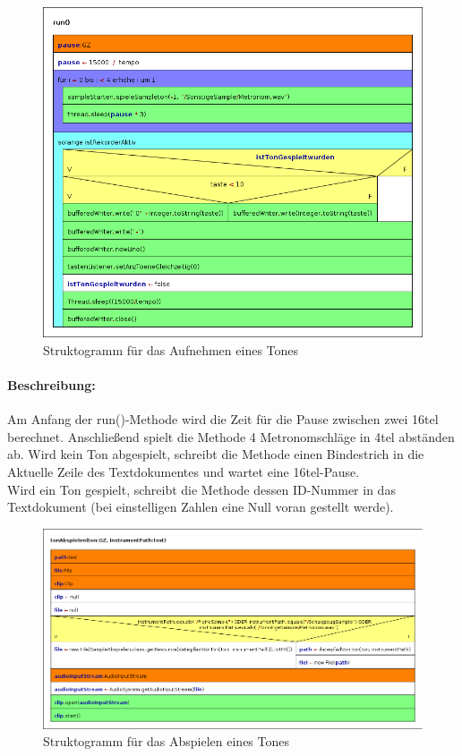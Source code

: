 \begin{figure}[h]
 \centering
 \includegraphics[width=1\textwidth]{./Bilder/Ton_Aufnehmen.png}
 \caption{Struktogramm für das Aufnehmen eines Tones}
\end{figure}

\paragraph{Beschreibung:} Am Anfang der run()-Methode wird die Zeit für die Pause zwischen zwei 
16tel berechnet. Anschließend spielt die Methode 4 Metronomschläge in 4tel abständen ab. Wird kein 
Ton abgespielt, schreibt die Methode einen Bindestrich in die Aktuelle Zeile des Textdokumentes und 
wartet eine 16tel-Pause.\\
Wird ein Ton gespielt, schreibt die Methode dessen ID-Nummer in das Textdokument (bei einstelligen 
Zahlen eine Null voran gestellt werde).\\



\newpage

\begin{figure}[h]
 \centering
 \includegraphics[width=1\textwidth]{./Bilder/tonAbspielen.png}
 \caption{Struktogramm für das Abspielen eines Tones} \label{fig:tonAbspielen}
\end{figure}


